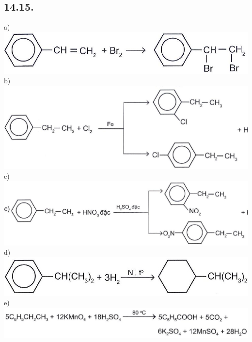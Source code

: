 \documentclass[10pt]{article}
\begin{document}
\subsection*{14.15.}
a)\\
\includegraphics[max width=\textwidth, center]{2025_10_23_adad5b98d65ac6665838g-26}\\
b)\\
\includegraphics[max width=\textwidth, center]{2025_10_23_adad5b98d65ac6665838g-26(2)}\\
c)\\
\includegraphics[max width=\textwidth, center]{2025_10_23_adad5b98d65ac6665838g-26(4)}\\
d)\\
\includegraphics[max width=\textwidth, center]{2025_10_23_adad5b98d65ac6665838g-26(6)}\\
e)\\
\includegraphics[max width=\textwidth, center]{2025_10_23_adad5b98d65ac6665838g-26(8)}\\
\end{document}
